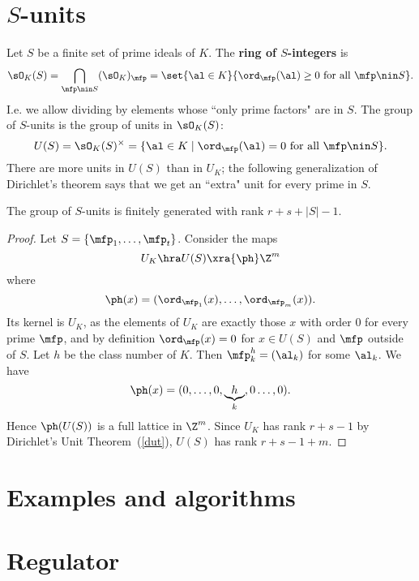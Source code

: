 \section{$S$-units}
\begin{df}
Let $S$ be a finite set of prime ideals of $K$. The \textbf{ring of $S$-integers} is
\[
\sO_K(S)=\bigcap_{\mfp\nin S}(\sO_K)_{\mfp}=\set{\al \in K}{\ord_{\mfp}(\al)\ge 0 \text{ for all }\mfp\nin S}.
\]
I.e. we allow dividing by elements whose ``only prime factors" are in $S$. 
The group of $S$-units is the group of units in $\sO_K(S)$:
\[
U(S)=\sO_K(S)^{\times} =\{\al\in K\mid \ord_{\mfp}(\al)=0\text{ for all }\mfp\nin S\}.
\]
There are more units in $U(S)$ than in $U_K$; the following generalization of Dirichlet's theorem says that we get an ``extra" unit for every prime in $S$.
\end{df}
\begin{thm}
The group of $S$-units is finitely generated with rank $r+s+|S| -1$.
\end{thm}
\begin{proof}
Let $S=\{\mfp_1,\ldots, \mfp_t\}$. 
Consider the maps
\[
U_K\hra U(S)\xra{\ph} \Z^m
\]
where 
\[
\ph(x)=(\ord_{\mfp_1}(x),\ldots, \ord_{\mfp_m}(x)).
\]
Its kernel is $U_K$, as the elements of $U_K$ are exactly those $x$ with order 0 for every prime $\mfp$, and by definition $\ord_{\mfp}(x)=0$ for $x\in U(S)$ and $\mfp$ outside of $S$. Let $h$ be the class number of $K$. Then $\mfp_k^h=(\al_k)$ for some $\al_k$. We have
\[
\ph(x)=(0,\ldots, 0,\underbrace{h}_k,0\ldots, 0).
\]
Hence $\ph(U(S))$ is a full lattice in $\Z^m$. Since $U_K$ has rank $r+s-1$ by Dirichlet's Unit Theorem~(\ref{dut}), $U(S)$ has rank $r+s-1+m$.
\end{proof}
\section{Examples and algorithms}
\section{Regulator}
